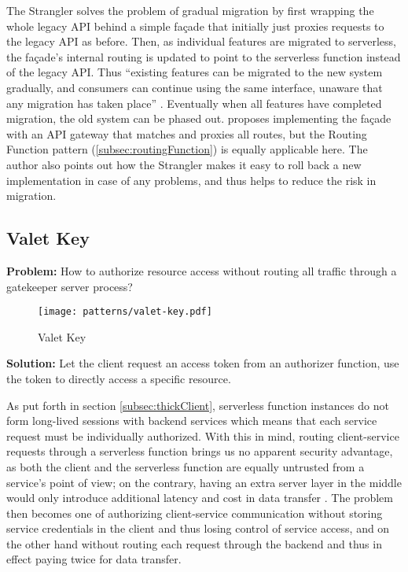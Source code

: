 The Strangler solves the problem of gradual migration by first wrapping the whole legacy API behind a simple façade that initially just proxies requests to the legacy API as before. Then, as individual features are migrated to serverless, the façade's internal routing is updated to point to the serverless function instead of the legacy API. Thus ``existing features can be migrated to the new system gradually, and consumers can continue using the same interface, unaware that any migration has taken place'' \parencite{microsoft18cloudPatterns}. Eventually when all features have completed migration, the old system can be phased out. \textcite{zambrano18patterns} proposes implementing the façade with an API gateway that matches and proxies all routes, but the Routing Function pattern (\ref{subsec:routingFunction}) is equally applicable here. The author also points out how the Strangler makes it easy to roll back a new implementation in case of any problems, and thus helps to reduce the risk in migration.

\subsection{Valet Key} \label{subsec:valetKey}

\textbf{Problem:} How to authorize resource access without routing all traffic through a gatekeeper server process?

\begin{figure}[h]
  \centering
  \texttt{[image: patterns/valet-key.pdf]}
  \caption{Valet Key}
  \label{fig:valetKey}
\end{figure}

\textbf{Solution:} Let the client request an access token from an authorizer function, use the token to directly access a specific resource.

As put forth in section \ref{subsec:thickClient}, serverless function instances do not form long-lived sessions with backend services which means that each service request must be individually authorized. With this in mind, routing client-service requests through a serverless function brings us no apparent security advantage, as both the client and the serverless function are equally untrusted from a service's point of view; on the contrary, having an extra server layer in the middle would only introduce additional latency and cost in data transfer \parencite{adzic2017serverless}. The problem then becomes one of authorizing client-service communication without storing service credentials in the client and thus losing control of service access, and on the other hand without routing each request through the backend and thus in effect paying twice for data transfer.

